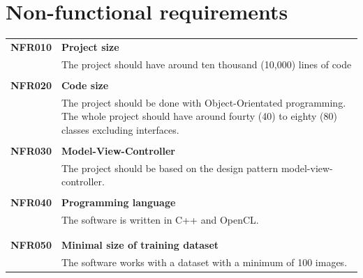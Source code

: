 \documentclass[parskip=full]{scrartcl}
\begin{document}
\section{Non-functional requirements}
\begin{tabular}{p{2cm}p{11.4cm}}
\textbf{NFR010} & \textbf{Project size}\\
& The project should have around ten thousand (10,000) lines of code \\
& \\
\textbf{NFR020} & \textbf{Code size}\\
& The project should be done with Object-Orientated programming. The whole project should have around fourty (40) to eighty (80) classes excluding interfaces. \\
& \\
\textbf{NFR030} & \textbf{Model-View-Controller}\\
& The project should be based on the design pattern model-view-controller. \\
& \\
\textbf{NFR040} & \textbf{Programming language}\\
& The software is written in C++ and OpenCL.\\
& \\
& \\
\textbf{NFR050} & \textbf{Minimal size of training dataset}\\
& The software works with a dataset with a minimum of 100 images.
\end{tabular}
\end{document}
